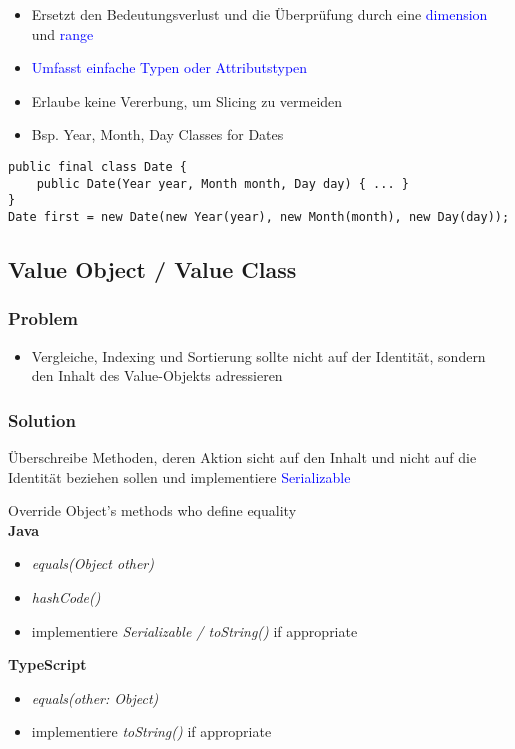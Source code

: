 \begin{itemize}
    \item Ersetzt den Bedeutungsverlust und die Überprüfung durch eine \textcolor{blue}{dimension} und \textcolor{blue}{range}
    \item \textcolor{blue}{Umfasst einfache Typen oder Attributstypen}
    \item Erlaube keine Vererbung, um Slicing zu vermeiden
    \item Bsp. Year, Month, Day Classes for Dates
\end{itemize}
\begin{lstlisting}
public final class Date {
    public Date(Year year, Month month, Day day) { ... }
}
Date first = new Date(new Year(year), new Month(month), new Day(day));
\end{lstlisting}

\subsection{Value Object / Value Class}
\subsubsection{Problem}
\begin{itemize}
    \item Vergleiche, Indexing und Sortierung sollte nicht auf der Identität, sondern den Inhalt des Value-Objekts adressieren
\end{itemize}

\subsubsection{Solution}
Überschreibe Methoden, deren Aktion sicht auf den Inhalt und nicht auf die Identität beziehen sollen und implementiere \textcolor{blue}{Serializable}

Override Object's methods who define equality \\

\textbf{Java}
\begin{itemize}
    \item \textit{equals(Object other)}
    \item \textit{hashCode()}
    \item implementiere \textit{Serializable / toString()} if appropriate
\end{itemize}
\vspace{10pt}
\textbf{TypeScript}
\begin{itemize}
    \item \textit{equals(other: Object)}
    \item implementiere \textit{toString()} if appropriate
\end{itemize}

